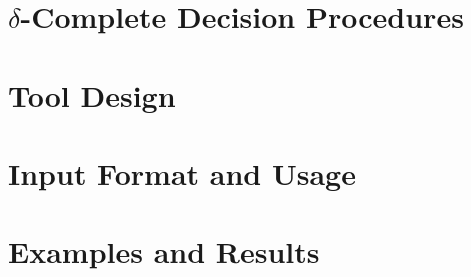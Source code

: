 \documentclass[envcountsect]{llncs}
\begin{document}
\section{$\delta$-Complete Decision Procedures}




\section{Tool Design}

\section{Input Format and Usage}

\section{Examples and Results}




\end{document}
